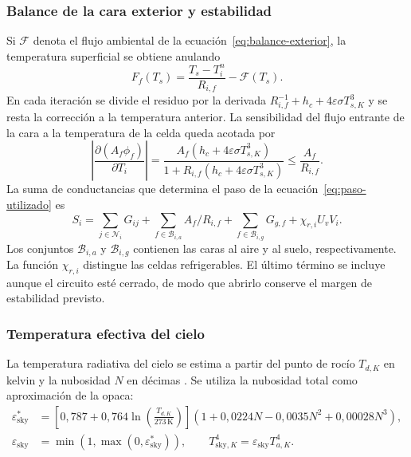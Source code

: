 \subsubsection{Balance de la cara exterior y estabilidad}
Si $\mathcal F$ denota el flujo ambiental de la ecuación~\eqref{eq:balance-exterior}, la temperatura superficial se obtiene anulando
\begin{equation}
 F_f(T_s)=\frac{T_s-T_i^n}{R_{i,f}}-\mathcal F(T_s).
\end{equation}
En cada iteración se divide el residuo por la derivada $R_{i,f}^{-1}+h_c+4\varepsilon\sigma T_{s,K}^3$ y se resta la corrección a la temperatura anterior. La sensibilidad del flujo entrante de la cara a la temperatura de la celda queda acotada por
\begin{equation}
 \left|\frac{\partial(A_f\phi_f)}{\partial T_i}\right|
 =\frac{A_f(h_c+4\varepsilon\sigma T_{s,K}^3)}
 {1+R_{i,f}(h_c+4\varepsilon\sigma T_{s,K}^3)}
 \leq\frac{A_f}{R_{i,f}}.
\end{equation}
La suma de conductancias que determina el paso de la ecuación~\eqref{eq:paso-utilizado} es
\begin{equation}
 S_i=\sum_{j\in\mathcal N_i}G_{ij}
 +\sum_{f\in\mathcal B_{i,a}}A_f/R_{i,f}
 +\sum_{f\in\mathcal B_{i,g}}G_{g,f}+\chi_{r,i}U_vV_i.
\end{equation}
Los conjuntos $\mathcal B_{i,a}$ y $\mathcal B_{i,g}$ contienen las caras al aire y al suelo, respectivamente. La función $\chi_{r,i}$ distingue las celdas refrigerables. El último término se incluye aunque el circuito esté cerrado, de modo que abrirlo conserve el margen de estabilidad previsto.

\subsubsection{Temperatura efectiva del cielo}
La temperatura radiativa del cielo se estima a partir del punto de rocío $T_{d,K}$ en kelvin y la nubosidad $N$ en décimas \citep{energyplusCielo}. Se utiliza la nubosidad total como aproximación de la opaca:
\begin{equation}\begin{aligned}
  \varepsilon_{\mathrm{sky}}^*&=
  \left[0{,}787+0{,}764\ln\left(\frac{T_{d,K}}{273\,\mathrm K}\right)\right]
  \left(1+0{,}0224N-0{,}0035N^2+0{,}00028N^3\right),\\
  \varepsilon_{\mathrm{sky}}&=\min(1,\max(0,\varepsilon_{\mathrm{sky}}^*)),
  \qquad T_{\mathrm{sky},K}^4=\varepsilon_{\mathrm{sky}}T_{a,K}^4.
\end{aligned}\end{equation}
